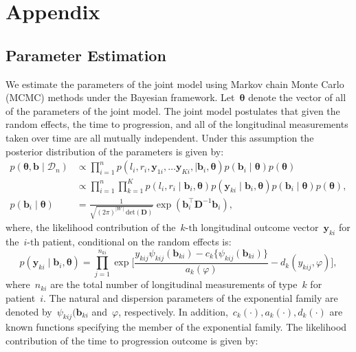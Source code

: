 \section*{Appendix}

\begin{subappendices}
\section{Parameter Estimation}
\label{c4:appendix:param_estimation}
We estimate the parameters of the joint model using Markov chain Monte Carlo (MCMC) methods under the Bayesian framework. Let~$\boldsymbol{\theta}$ denote the vector of all of the parameters of the joint model. The joint model postulates that given the random effects, the time to progression, and all of the longitudinal measurements taken over time are all mutually independent. Under this assumption the posterior distribution of the parameters is given by:
\begin{align*}
p(\boldsymbol{\theta}, \boldsymbol{b} \mid \mathcal{D}_n) & \propto \prod_{i=1}^n p(l_i, r_i, \boldsymbol{y}_{1i},\ldots \boldsymbol{y}_{Ki}, \mid \boldsymbol{b}_i, \boldsymbol{\theta}) p(\boldsymbol{b}_i \mid \boldsymbol{\theta}) p(\boldsymbol{\theta})\\
& \propto \prod_{i=1}^n \prod_{k=1}^K p(l_i, r_i \mid \boldsymbol{b}_i, \boldsymbol{\theta})  p(\boldsymbol{y}_{ki} \mid \boldsymbol{b}_{i}, \boldsymbol{\theta}) p(\boldsymbol{b}_i \mid \boldsymbol{\theta}) p(\boldsymbol{\theta}),\\
p(\boldsymbol{b}_i \mid \boldsymbol{\theta}) &= \frac{1}{\sqrt{(2 \pi)^{\mid W \mid} \text{det}(\boldsymbol{D})}} \exp(\boldsymbol{b}_i^{\top} \boldsymbol{D}^{-1} \boldsymbol{b}_i),
\end{align*}
where, the likelihood contribution of the~${k\mbox{-th}}$ longitudinal outcome vector~$\boldsymbol{y}_{ki}$ for the~${i\mbox{-th}}$ patient, conditional on the random effects is:
\begin{equation*}
p(\boldsymbol{y}_{ki} \mid \boldsymbol{b}_i, \boldsymbol{\theta}) = \prod_{j=1}^{n_{ki}} \exp\Bigg[\frac{y_{kij} \psi_{kij}(\boldsymbol{b}_{ki}) - c_k\big\{\psi_{kij}(\boldsymbol{b}_{ki})\big\}}{a_k(\varphi)} - d_k(y_{kij}, \varphi)\Bigg],
\end{equation*}
where~$n_{ki}$ are the total number of longitudinal measurements of type~$k$ for patient~$i$. The natural and dispersion parameters of the exponential family are denoted by~$\psi_{kij}(\boldsymbol{b}_{ki}$ and~$\varphi$, respectively. In addition,~$c_k(\cdot), a_k(\cdot), d_k(\cdot)$ are known functions specifying the member of the exponential family. The likelihood contribution of the time to progression outcome is given by:

\end{subappendices}
